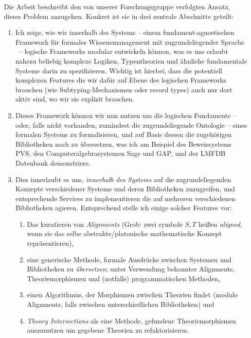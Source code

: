 Die Arbeit beschreibt den von unserer Forschungsgruppe verfolgten Ansatz, dieses Problem anzugehen. Konkret ist sie in drei zentrale Abschnitte geteilt:
\begin{enumerate}
	\item Ich zeige, wie wir innerhalb des \mmt Systems -- einem fundament-agnostischen Framework für formales Wissensmanagement mit zugrundeliegender Sprache \ommt\ -- logische Frameworks modular entwickeln können, was es uns erlaubt nahezu beliebig komplexe Logiken, Typentheorien und ähnliche fundamentale Systeme darin zu spezifizieren. Wichtig ist hierbei, dass die potentiell komplexen Features die wir dafür auf Ebene des logischen Frameworks brauchen (wie Subtyping-Mechanismen oder record types) auch nur dort aktiv sind, wo wir sie explizit brauchen.
	\item Dieses Framework können wir nun nutzen um die logischen Fundamente -- oder, falls nicht vorhanden, zumindest die zugrundeliegende Ontologie -- eines formalen Systems zu formalisieren, und auf Basis dessen die zugehörigen Bibliotheken nach \ommt zu übersetzen, was ich am Beispiel des Beweissystems PVS, den Computeralgebrasystemen Sage und GAP, und der LMFDB Datenbank demonstriere. 
	\item Dies innerlaubt es uns, \emph{innerhalb des \mmt Systems} auf die zugrundeliegenden Konzepte verschiedener Systeme und deren Bibliotheken zuzugreifen, und entsprechende Services zu implementieren die auf mehreren verschiedenen Bibliotheken agieren. Entsprechend stelle ich einige solcher Features vor:
	\begin{enumerate}
		\item Das kuratieren von \emph{Alignments} (Grob: zwei symbole $S,T$ heißen \emph{aligned}, wenn sie das selbe abstrakte/platonische mathematische Konzept repräsentieren),
		\item eine generische Methode, formale Ausdrücke zwischen Systemen und Bibliotheken zu \emph{übersetzen}; unter Verwendung bekannter Alignments, Theoriemorphismen und (notfalls) programmatischen Methoden,
		\item einen Algorithmus, der Morphismen zwischen Theorien findet (modulo Alignments, falls zwischen unterschiedlichen Bibliotheken) und
		\item \emph{Theory Intersections} als eine Methode, gefundene Theoriemorphismen auszunutzen um gegebene Theorien zu refaktorisieren.
	\end{enumerate}
\end{enumerate}
